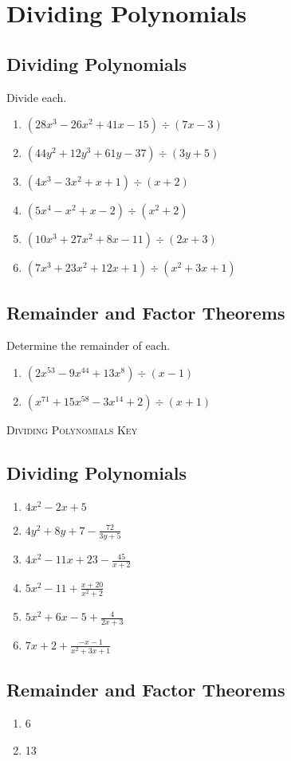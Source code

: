 \chapter{Dividing Polynomials}

\section{Dividing Polynomials}

Divide each.
\begin{enumerate}
    \item $(28x^3-26x^2+41x-15) \div (7x-3)$
    \item $(44y^2+12y^3+61y-37) \div (3y+5)$
    \item $\left(4x^3 - 3x^2 + x + 1\right) \div (x + 2)$
    \item $\left(5x^4 - x^2 + x - 2\right) \div (x^2 + 2)$
    \item $\left(10x^3 + 27x^2 + 8x - 11\right) \div (2x+3)$
	\item $\left(7x^3 + 23x^2 + 12x + 1\right) \div \left(x^2+3x+1\right)$
\end{enumerate}

\section{Remainder and Factor Theorems}

Determine the remainder of each.
\begin{enumerate}
	\item $\left(2x^{53} - 9x^{44} + 13x^8\right) \div (x - 1)$
	\item $\left(x^{71} + 15x^{58} - 3x^{14} + 2\right) \div (x + 1)$
\end{enumerate}

\newpage

\textsc{Dividing Polynomials Key}

\section*{Dividing Polynomials}

\begin{enumerate}
    \item $4x^2-2x+5$
    \item $4y^2+8y+7-\frac{72}{3y+5}$
    \item $4x^2 - 11x + 23 - \frac{45}{x+2}$
    \item $5x^2 - 11 + \frac{x+20}{x^2+2}$
    \item $5x^2 + 6x - 5 + \frac{4}{2x+3}$
    \item $7x + 2 + \frac{-x-1}{x^2+3x+1}$
\end{enumerate}

\section*{Remainder and Factor Theorems}

\begin{enumerate}
	\item 6
	\item 13
\end{enumerate}